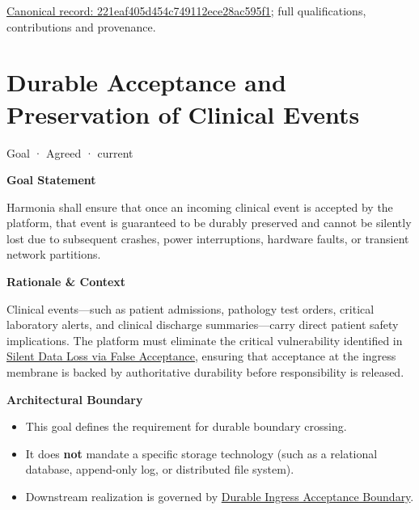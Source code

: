 {\footnotesize \href{../../../../continuum/motivation/goal/221eaf405d454c749112ece28ac595f1.md}{Canonical record: 221eaf405d454c749112ece28ac595f1}; full qualifications, contributions and provenance.}\par
\section{Durable Acceptance and Preservation of Clinical Events}

\label{element:44daa77317aa44b7967b62b295d7288d}
{\small Goal · Agreed · current}\par

\par\medskip\textbf{Goal Statement}\par


Harmonia shall ensure that once an incoming clinical event is accepted by the platform, that event is guaranteed to be durably preserved and cannot be silently lost due to subsequent crashes, power interruptions, hardware faults, or transient network partitions.



\par\medskip\textbf{Rationale \& Context}\par


Clinical events—such as patient admissions, pathology test orders, critical laboratory alerts, and clinical discharge summaries—carry direct patient safety implications. The platform must eliminate the critical vulnerability identified in \href{\detokenize{../../../../../docs/markdown/01-motivation/drivers-assessments/assessments.md}}{Silent Data Loss via False Acceptance}, ensuring that acceptance at the ingress membrane is backed by authoritative durability before responsibility is released.



\par\medskip\textbf{Architectural Boundary}\par


\begin{itemize}


\item This goal defines the requirement for durable boundary crossing.

\item It does \textbf{not} mandate a specific storage technology (such as a relational database, append-only log, or distributed file system).

\item Downstream realization is governed by \href{\detokenize{../../../../../docs/markdown/01-motivation/requirements-constraints/foundational-requirements.md}}{\texttt{} Durable Ingress Acceptance Boundary}.

\end{itemize}

